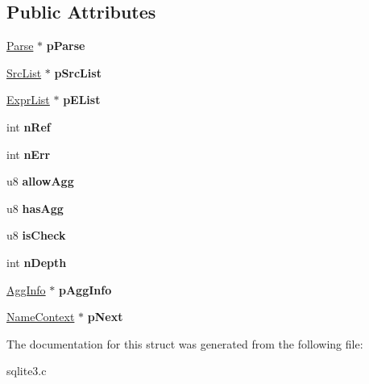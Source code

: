 \subsection*{Public Attributes}
\begin{DoxyCompactItemize}
\item 
\hypertarget{struct_name_context_a14635249bf75d5e18124089571dd2386}{\hyperlink{struct_parse}{Parse} $\ast$ {\bfseries p\-Parse}}\label{struct_name_context_a14635249bf75d5e18124089571dd2386}

\item 
\hypertarget{struct_name_context_a6ede21da33e2e9bd3d0c5fe90a3ec72c}{\hyperlink{struct_src_list}{Src\-List} $\ast$ {\bfseries p\-Src\-List}}\label{struct_name_context_a6ede21da33e2e9bd3d0c5fe90a3ec72c}

\item 
\hypertarget{struct_name_context_a8c752d7fb9b28179156c569cc57ba6f2}{\hyperlink{struct_expr_list}{Expr\-List} $\ast$ {\bfseries p\-E\-List}}\label{struct_name_context_a8c752d7fb9b28179156c569cc57ba6f2}

\item 
\hypertarget{struct_name_context_ad68616ce2a58fa1b135e0dcf953bdc97}{int {\bfseries n\-Ref}}\label{struct_name_context_ad68616ce2a58fa1b135e0dcf953bdc97}

\item 
\hypertarget{struct_name_context_aba0b89b42e945c4c96d57a8fe011329c}{int {\bfseries n\-Err}}\label{struct_name_context_aba0b89b42e945c4c96d57a8fe011329c}

\item 
\hypertarget{struct_name_context_a78dc76c1493dd2f74f5f1ec661039665}{u8 {\bfseries allow\-Agg}}\label{struct_name_context_a78dc76c1493dd2f74f5f1ec661039665}

\item 
\hypertarget{struct_name_context_a6edabae39c69ad9a748f9ea519d9f56e}{u8 {\bfseries has\-Agg}}\label{struct_name_context_a6edabae39c69ad9a748f9ea519d9f56e}

\item 
\hypertarget{struct_name_context_a8098661d47980e74f56c686772dcaf85}{u8 {\bfseries is\-Check}}\label{struct_name_context_a8098661d47980e74f56c686772dcaf85}

\item 
\hypertarget{struct_name_context_a8d817459b89601643a6f3db81c791397}{int {\bfseries n\-Depth}}\label{struct_name_context_a8d817459b89601643a6f3db81c791397}

\item 
\hypertarget{struct_name_context_aeb3ff72c03dd770d421cadc2195a5644}{\hyperlink{struct_agg_info}{Agg\-Info} $\ast$ {\bfseries p\-Agg\-Info}}\label{struct_name_context_aeb3ff72c03dd770d421cadc2195a5644}

\item 
\hypertarget{struct_name_context_a82ce0ec8a3cc3d792e1f38bb5e0ad5fc}{\hyperlink{struct_name_context}{Name\-Context} $\ast$ {\bfseries p\-Next}}\label{struct_name_context_a82ce0ec8a3cc3d792e1f38bb5e0ad5fc}

\end{DoxyCompactItemize}


The documentation for this struct was generated from the following file\-:\begin{DoxyCompactItemize}
\item 
sqlite3.\-c\end{DoxyCompactItemize}
